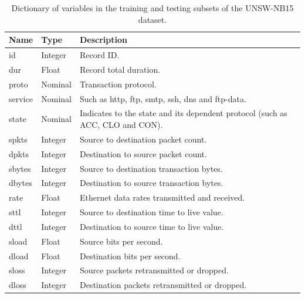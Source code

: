 \documentclass[
  a4paper,
]{scrreprt}
\begin{document}
\begin{longtable}[]{@{}
  >{\raggedright\arraybackslash}p{}
  >{\raggedright\arraybackslash}p{}
  >{\raggedright\arraybackslash}p{}@{}}

\caption{\label{tbl-dict}Dictionary of variables in the training and
testing subsets of the UNSW-NB15 dataset.}

\tabularnewline

\toprule\noalign{}
\begin{minipage}[b]{\linewidth}\raggedright
Name
\end{minipage} & \begin{minipage}[b]{\linewidth}\raggedright
Type
\end{minipage} & \begin{minipage}[b]{\linewidth}\raggedright
Description
\end{minipage} \\
\midrule\noalign{}
\endhead
\bottomrule\noalign{}
\endlastfoot
id & Integer & Record ID. \\
dur & Float & Record total duration. \\
proto & Nominal & Transaction protocol. \\
service & Nominal & Such as http, ftp, smtp, ssh, dns and ftp-data. \\
state & Nominal & Indicates to the state and its dependent protocol
(such as ACC, CLO and CON). \\
spkts & Integer & Source to destination packet count. \\
dpkts & Integer & Destination to source packet count. \\
sbytes & Integer & Source to destination transaction bytes. \\
dbytes & Integer & Destination to source transaction bytes. \\
rate & Float & Ethernet data rates transmitted and received. \\
sttl & Integer & Source to destination time to live value. \\
dttl & Integer & Destination to source time to live value. \\
sload & Float & Source bits per second. \\
dload & Float & Destination bits per second. \\
sloss & Integer & Source packets retransmitted or dropped. \\
dloss & Integer & Destination packets retransmitted or dropped. \\

\end{longtable}
\end{document}
